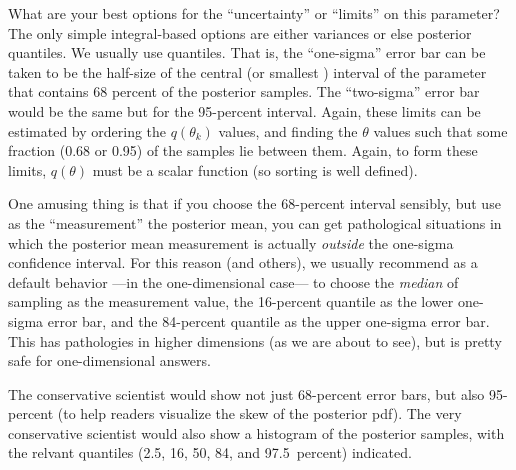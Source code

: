 \documentclass[12pt,twoside,pdftex]{article}
\newcommand{\pars}{\theta}
\begin{document}
What are your best options for the ``uncertainty'' or ``limits'' on this parameter?
The only simple integral-based options are either variances or else posterior quantiles.
We usually use quantiles.
That is, the ``one-sigma'' error bar can be taken to be the half-size of the central (or smallest%
  ) interval of the parameter
  that contains 68 percent of the posterior samples.
The ``two-sigma'' error bar would be the same but for the 95-percent interval.
Again, these limits can be estimated%
  by ordering the $q(\pars_k)$ values,
  and finding the $\pars$ values such that some fraction (0.68 or 0.95)
  of the samples lie between them.
Again, to form these limits, $q(\pars)$ must be a scalar function (so sorting is well defined).

One amusing thing is that if you choose the 68-percent interval sensibly,
  but use as the ``measurement'' the posterior mean,
  you can get pathological situations in which the posterior mean measurement
  is actually \emph{outside} the one-sigma confidence interval.
For this reason (and others), we usually recommend as a default behavior%
  ---in the one-dimensional case---%
  to choose the \emph{median} of sampling as the measurement value,
  the 16-percent quantile as the lower one-sigma error bar,
  and the 84-percent quantile as the upper one-sigma error bar.
This has pathologies in higher dimensions (as we are about to see),
  but is pretty safe for one-dimensional answers.

The conservative scientist would show not just 68-percent error bars,
  but also 95-percent
  (to help readers visualize the skew of the posterior pdf).
The very conservative scientist would also show a histogram
  of the posterior samples,
  with the relvant quantiles (2.5, 16, 50, 84, and 97.5~percent) indicated.
\end{document}
